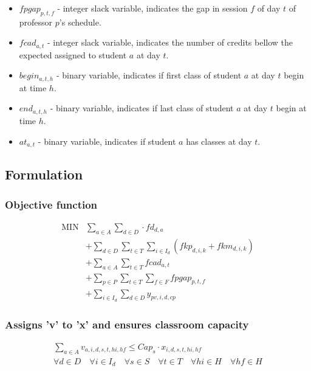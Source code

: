 \begin{itemize}
\item $fpgap_{p,t,f}$ - integer slack variable, indicates the gap in session $f$ of day $t$ of professor $p$'s schedule.
\item $fcad_{a,t}$ - integer slack variable, indicates the number of credits bellow the expected assigned to student $a$ at day $t$.
\item $begin_{a,t,h}$ - binary variable, indicates if first class of student $a$ at day $t$ begin at time $h$.
\item $end_{a,t,h}$ - binary variable, indicates if last class of student $a$ at day $t$ begin at time $h$.
\item $at_{a,t}$ - binary variable, indicates if student $a$ has classes at day $t$.

\end{itemize}



\subsection{Formulation}


\subsubsection{Objective function}
$$
\begin{array}{rl}
   \mbox{MIN} &
			\sum\limits_{a \in A}\sum\limits_{d \in D} \cdot fd_{d,a}
      \\
      &
       + \sum\limits_{d \in D} 
\sum\limits_{t \in T} \sum\limits_{i \in I_{d}} (fkp_{d,i,k} + fkm_{d,i,k})
      \\
      &
       + \sum\limits_{a \in A} \sum\limits_{t \in T} fcad_{a,t}
      \\
      &      
      + \sum\limits_{p \in P} \sum\limits_{t \in T} \sum\limits_{f \in F} fpgap_{p,t,f}
      \\
      &
      + \sum\limits_{i \in I_{d}} \sum\limits_{d \in D} y_{pv,i,d,cp}
\end{array}
$$




\subsubsection{Assigns 'v' to 'x' and ensures classroom capacity}
\begin{eqnarray}
\sum\limits_{a \in A} v_{a,i,d,s,t,hi,hf}  \le Cap_{s} \cdot x_{i,d,s,t,hi,hf} \nonumber \qquad 
\\
\forall d \in D \quad
\forall i \in I_{d} \quad 
\forall s \in S \quad
\forall t \in T \quad 
\forall hi \in H \quad 
\forall hf \in H
\end{eqnarray}

